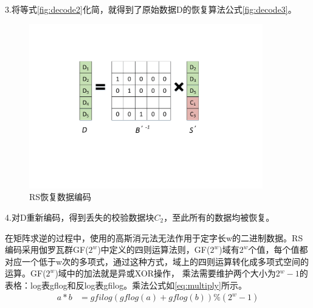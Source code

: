 3.将等式\autoref{fig:decode2}化简，就得到了原始数据D的恢复算法公式\autoref{fig:decode3}。
\begin{figure}[H]
	\centering
	\includegraphics[width=4in]{Pics/decode3.pdf}
	\caption{RS恢复数据编码}\label{fig:decode3}
\end{figure}


4.对D重新编码，得到丢失的校验数据块$C_2$，至此所有的数据均被恢复。


在矩阵求逆的过程中，使用的高斯消元法无法作用于定字长w的二进制数据。RS编码采用伽罗瓦群GF($2^w$)中定义的四则运算法则，GF($2^w$)域有$2^w$个值，每个值都对应一个低于w次的多项式，通过这种方式，域上的四则运算转化成多项式空间的运算。GF($2^w$)域中的加法就是异或XOR操作，
乘法需要维护两个大小为2$^{w}-1$的表格：log表gflog和反log表gfilog。乘法公式如\autoref{eq:multiply}所示。
\begin{equation}
\label{eq:multiply}
\begin{aligned}
    a * b &=gfilog(gflog(a) + gflog(b)) \% (2^w-1)
\end{aligned}
\end{equation}

